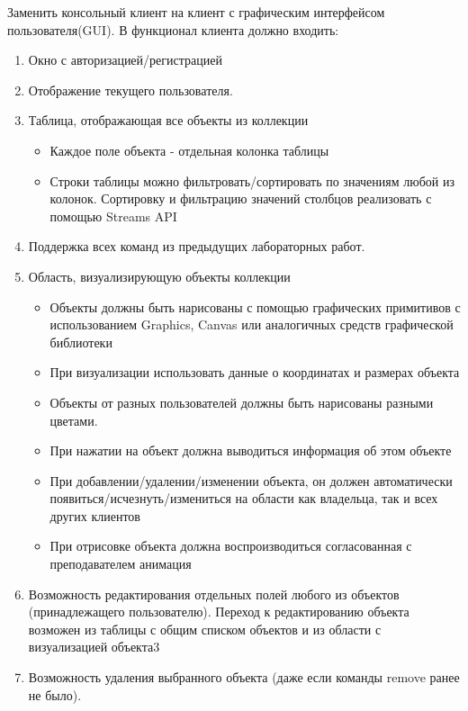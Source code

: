 \documentclass[14pt,final,oneside]{extreport}%
\begin{document}
    Заменить консольный клиент на клиент с графическим интерфейсом пользователя(GUI). 
    В функционал клиента должно входить:
    \begin{enumerate}
        \item Окно с авторизацией/регистрацией
        \item Отображение текущего пользователя.
        \item Таблица, отображающая все объекты из коллекции
        \begin{itemize}
            \item Каждое поле объекта - отдельная колонка таблицы
            \item Строки таблицы можно фильтровать/сортировать по значениям любой из колонок. Сортировку и фильтрацию значений столбцов реализовать с помощью Streams API
        \end{itemize}
        \item Поддержка всех команд из предыдущих лабораторных работ.
        \item Область, визуализирующую объекты коллекции
        \begin{itemize}
            \item Объекты должны быть нарисованы с помощью графических примитивов с использованием Graphics, Canvas или аналогичных средств графической библиотеки
            \item При визуализации использовать данные о координатах и размерах объекта
            \item Объекты от разных пользователей должны быть нарисованы разными цветами.
            \item При нажатии на объект должна выводиться информация об этом объекте
            \item При добавлении/удалении/изменении объекта, он должен автоматически появиться/исчезнуть/измениться  на области как владельца, так и всех других клиентов
            \item При отрисовке объекта должна воспроизводиться согласованная с преподавателем анимация
        \end{itemize}
        \item Возможность редактирования отдельных полей любого из объектов (принадлежащего пользователю). Переход к редактированию объекта возможен из таблицы с общим списком объектов и из области с визуализацией объекта3
        \item Возможность удаления выбранного объекта (даже если команды remove ранее не было).
    \end{enumerate}
\end{document}
